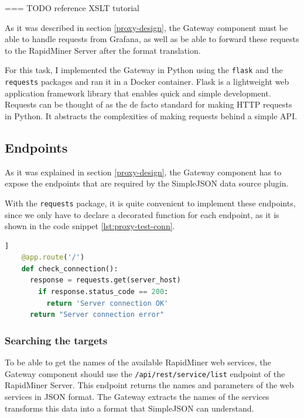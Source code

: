 
\begin{center}
	=== TODO reference XSLT tutorial
\end{center}

As it was described in section \ref{proxy-design}, the Gateway component must be able to handle requests from Grafana, as well as be able to forward these requests to the RapidMiner Server after the format translation. 

For this task, I implemented the Gateway in Python using the \texttt{flask} and the \texttt{requests} packages and ran it in a Docker container. Flask is a lightweight web application framework library that enables quick and simple development. Requests can be thought of as the de facto standard for making HTTP requests in Python. It abstracts the complexities of making requests behind a simple API.

\subsection{Endpoints}

As it was explained in section \ref{proxy-design}, the Gateway component has to expose the endpoints that are required by the SimpleJSON data source plugin.

With the \texttt{requests} package, it is quite convenient to implement these endpoints, since we only have to declare a decorated function for each endpoint, as it is shown in the code snippet \ref{lst:proxy-test-conn}.

\begin{minipage}{\linewidth}
\begin{lstlisting}[language=Python, caption={Test the connection to the server}, label={lst:proxy-test-conn}]]
	@app.route('/')
	def check_connection():
	  response = requests.get(server_host)
	    if response.status_code == 200:
	      return 'Server connection OK'
	  return "Server connection error"
\end{lstlisting}
\end{minipage}
\subsubsection{Searching the targets}

To be able to get the names of the available RapidMiner web services, the Gateway component should use the \texttt{/api/rest/service/list} endpoint of the RapidMiner Server. This endpoint returns the names and parameters of the web services in JSON format. The Gateway extracts the names of the services transforms this data into a format that SimpleJSON can understand.

